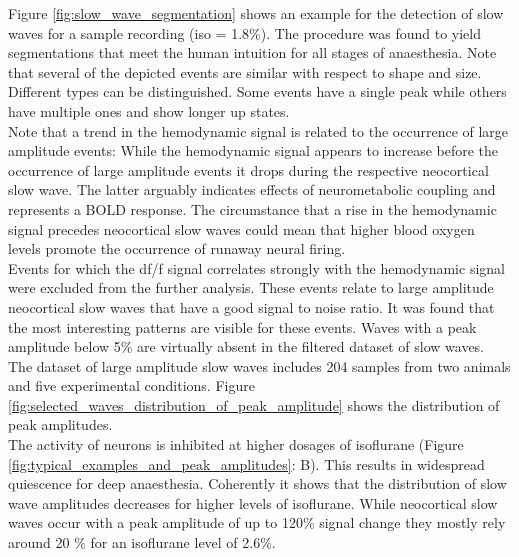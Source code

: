  Figure \ref{fig:slow_wave_segmentation} shows an example for the detection of slow waves for a sample recording (iso = 1.8\%). The procedure was found to yield segmentations that meet the human intuition for all stages of anaesthesia. Note that several of the depicted events are similar with respect to shape and size. Different types can be distinguished. Some events have a single peak while others have multiple ones and show longer up states. \\
 Note that a trend in the hemodynamic signal is related to the occurrence of large amplitude events: While the hemodynamic signal appears to increase before the occurrence of large amplitude events it drops during the respective neocortical slow wave. The latter arguably indicates effects of neurometabolic coupling and represents a BOLD response. The circumstance that a rise in the hemodynamic signal precedes neocortical slow waves could mean that higher blood oxygen levels promote the occurrence of runaway neural firing. \\
 Events for which the df/f signal correlates strongly with the hemodynamic signal were excluded from the further analysis. These events relate to large amplitude neocortical slow waves that have a good signal to noise ratio. It was found that the most interesting patterns are visible for these events. Waves with a peak amplitude below 5\% are virtually absent in the filtered dataset of slow waves. The dataset of large amplitude slow waves includes 204 samples from two animals and five experimental conditions. Figure \ref{fig:selected_waves_distribution_of_peak_amplitude} shows the distribution of peak amplitudes.\\
The activity of neurons is inhibited at higher dosages of isoflurane (Figure \ref{fig:typical_examples_and_peak_amplitudes}: B). This results in widespread quiescence for deep anaesthesia. Coherently it shows that the distribution of slow wave amplitudes decreases for higher levels of isoflurane. While neocortical slow waves occur with a peak amplitude of up to 120\% signal change they mostly rely around 20 \% for an isoflurane level of 2.6\%. \\
